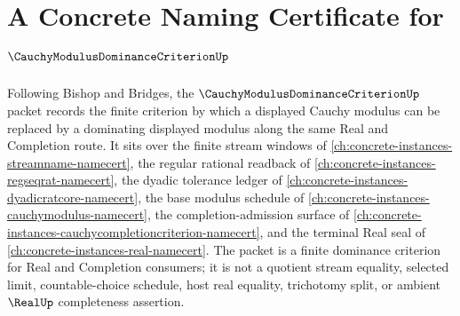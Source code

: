 \chapter{A Concrete Naming Certificate for $\CauchyModulusDominanceCriterionUp$}
\label{ch:concrete-instances-cauchy-modulus-dominance-criterion-namecert}

Following Bishop and Bridges, the $\CauchyModulusDominanceCriterionUp$ packet records the finite criterion by which a displayed Cauchy modulus can be replaced by a dominating displayed modulus along the same Real and Completion route. It sits over the finite stream windows of \autoref{ch:concrete-instances-streamname-namecert}, the regular rational readback of \autoref{ch:concrete-instances-regseqrat-namecert}, the dyadic tolerance ledger of \autoref{ch:concrete-instances-dyadicratcore-namecert}, the base modulus schedule of \autoref{ch:concrete-instances-cauchymodulus-namecert}, the completion-admission surface of \autoref{ch:concrete-instances-cauchycompletioncriterion-namecert}, and the terminal Real seal of \autoref{ch:concrete-instances-real-namecert}. The packet is a finite dominance criterion for Real and Completion consumers; it is not a quotient stream equality, selected limit, countable-choice schedule, host real equality, trichotomy split, or ambient $\RealUp$ completeness assertion.

